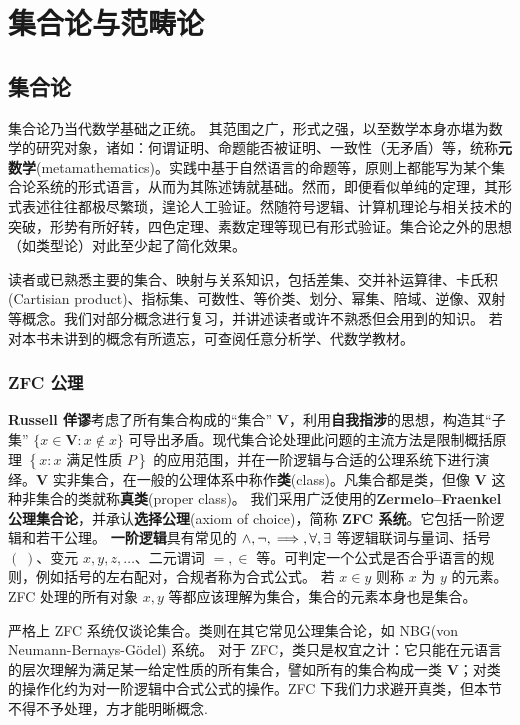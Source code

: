 \chapter{集合论与范畴论}\label{appx:cat}
\section{集合论}
集合论乃当代数学基础之正统。
其范围之广，形式之强，以至数学本身亦堪为数学的研究对象，诸如：何谓证明、命题能否被证明、一致性（无矛盾）等，统称\textbf{元数学}(metamathematics)。实践中基于自然语言的命题等，原则上都能写为某个集合论系统的形式语言，从而为其陈述铸就基础。然而，即便看似单纯的定理，其形式表述往往都极尽繁琐，遑论人工验证。然随符号逻辑、计算机理论与相关技术的突破，形势有所好转，四色定理、素数定理等现已有形式验证。集合论之外的思想（如类型论）对此至少起了简化效果。

读者或已熟悉主要的集合、映射与关系知识，包括差集、交并补运算律、卡氏积(Cartisian product)、指标集、可数性、等价类、划分、幂集、陪域、逆像、双射等概念。我们对部分概念进行复习，并讲述读者或许不熟悉但会用到的知识。
若对本书未讲到的概念有所遗忘，可查阅任意分析学、代数学教材。

\subsection{ZFC 公理}

\textbf{Russell 佯谬}考虑了所有集合构成的“集合” $\mathbf{V}$，利用\textbf{自我指涉}的思想，构造其“子集” $\{x \in \mathbf{V} : x \notin x\}$ 可导出矛盾。现代集合论处理此问题的主流方法是限制概括原理 $\left\{x : \text{$x$ 满足性质 $P$}\right\}$ 的应用范围，并在一阶逻辑与合适的公理系统下进行演绎。$\mathbf{V}$ 实非集合，在一般的公理体系中称作\textbf{类}(class)。凡集合都是类，但像 $\mathbf{V}$ 这种非集合的类就称\textbf{真类}(proper class)。
我们采用广泛使用的\textbf{Zermelo–Fraenkel 公理集合论}，并承认\textbf{选择公理}(axiom of choice)，简称 \textbf{ZFC 系统}。它包括一阶逻辑和若干公理。
\textbf{一阶逻辑}具有常见的 $\wedge,\neg,\implies,\forall,\exists$ 等逻辑联词与量词、括号 $(\;)$、变元 $x, y, z,\ldots$、二元谓词 $=,\in$ 等。可判定一个公式是否合乎语言的规则，例如括号的左右配对，合规者称为合式公式。
若 $x \in y$ 则称 $x$ 为 $y$ 的元素。ZFC 处理的所有对象 $x,y$ 等都应该理解为集合，集合的元素本身也是集合。

严格上 ZFC 系统仅谈论集合。类则在其它常见公理集合论，如 NBG(von Neumann-Bernays-Gödel) 系统。
对于 ZFC，类只是权宜之计：它只能在元语言的层次理解为满足某一给定性质的所有集合，譬如所有的集合构成一类 $\mathbf{V}$；对类的操作化约为对一阶逻辑中合式公式的操作。ZFC 下我们力求避开真类，但本节不得不予处理，方才能明晰概念.

